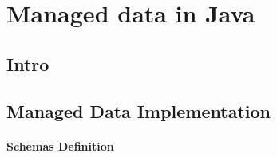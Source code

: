 



\chapter{Managed data in Java}\label{Implementation}
\section{Intro}\label{sec:Intro Implementation}

\section{Managed Data Implementation}\label{sec:Managed Data Implementation}

\subsubsection{Schemas Definition}\label{Schema Definition}


